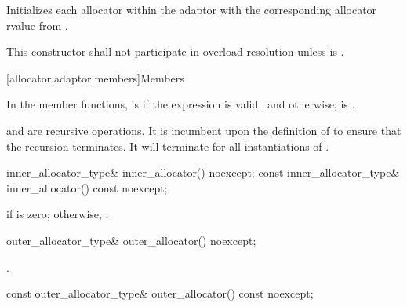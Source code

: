\begin{itemdescr}
\pnum
\effects Initializes each allocator within the adaptor with the corresponding allocator rvalue
from .

\pnum
\remarks This constructor shall not participate in overload resolution unless
 is .
\end{itemdescr}

[allocator.adaptor.members]{Members}

\pnum
In the  member functions,
 is
 if
the expression  is
valid~ and
 otherwise;
 is
.
\begin{note}  and
 are recursive operations. It
is incumbent upon the definition of  to ensure that the
recursion terminates. It will terminate for all instantiations of
. \end{note}

%
\begin{itemdecl}
inner_allocator_type& inner_allocator() noexcept;
const inner_allocator_type& inner_allocator() const noexcept;
\end{itemdecl}

\begin{itemdescr}
\pnum
\returns {} if  is zero; otherwise,
.
\end{itemdescr}

%
\begin{itemdecl}
outer_allocator_type& outer_allocator() noexcept;
\end{itemdecl}

\begin{itemdescr}
\pnum
\returns {}.
\end{itemdescr}

%
\begin{itemdecl}
const outer_allocator_type& outer_allocator() const noexcept;
\end{itemdecl}

